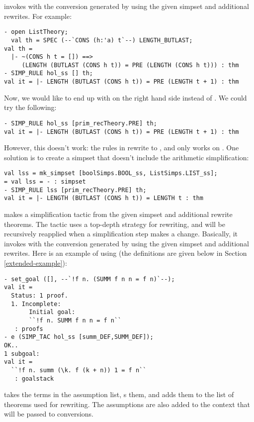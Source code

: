 \documentclass[a4]{article}
\begin{document}
 invokes  with the conversion generated
by  using the given simpset and additional rewrites. For
example:
\begin{verbatim}
- open ListTheory;
  val th = SPEC (--`CONS (h:'a) t`--) LENGTH_BUTLAST;
val th =
  |- ~(CONS h t = []) ==>
     (LENGTH (BUTLAST (CONS h t)) = PRE (LENGTH (CONS h t))) : thm
- SIMP_RULE hol_ss [] th;
val it = |- LENGTH (BUTLAST (CONS h t)) = PRE (LENGTH t + 1) : thm
\end{verbatim}
Now, we would like to end up with  on the right hand side
instead of . We could try the following:
\begin{verbatim}
- SIMP_RULE hol_ss [prim_recTheory.PRE] th;
val it = |- LENGTH (BUTLAST (CONS h t)) = PRE (LENGTH t + 1) : thm
\end{verbatim}
However, this doesn't work: the rules in  rewrite  to
, and  only works on . One solution is to
create a simpset that doesn't include the arithmetic simplification:
\begin{verbatim}
val lss = mk_simpset [boolSimps.BOOL_ss, ListSimps.LIST_ss];
= val lss = - : simpset
- SIMP_RULE lss [prim_recTheory.PRE] th;
val it = |- LENGTH (BUTLAST (CONS h t)) = LENGTH t : thm
\end{verbatim}

 makes a simplification tactic from the given simpset
and additional rewrite theorems. The tactic uses a top-depth strategy
for rewriting, and will be recursively reapplied when a simplification
step makes a change. Basically, it invokes  with the
conversion generated by  using the given simpset and
additional rewrites. Here is an example of using  (the
definitions are given below in Section \ref{extended-example}):
\begin{verbatim}
- set_goal ([], --`!f n. (SUMM f n n = f n)`--);
val it =
  Status: 1 proof.
  1. Incomplete:
       Initial goal:
       ``!f n. SUMM f n n = f n``
   : proofs
- e (SIMP_TAC hol_ss [summ_DEF,SUMM_DEF]);
OK..
1 subgoal:
val it =
  ``!f n. summ (\k. f (k + n)) 1 = f n``
   : goalstack
\end{verbatim}

 takes the terms in the assumption list,
s them, and adds them to the list of theorems used for
rewriting. The assumptions are also added to the context that will be
passed to conversions.
\end{document}
